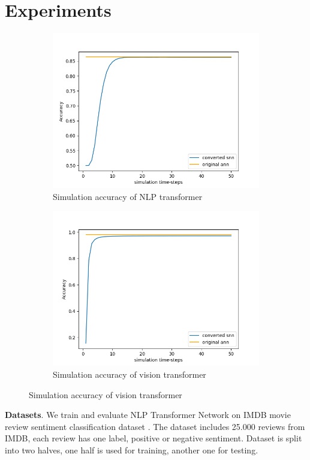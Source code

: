\documentclass{article}
\begin{document}
\section{Experiments}

\begin{figure}
\centering
    \begin{subfigure}
      \centering
      \includegraphics[width=0.7\linewidth]{assets_simulated_accuracy_nlp_v2.png}
      \caption[width=.4\linewidth]{Simulation accuracy of NLP transformer}
      \label{fig:sub1}
    \end{subfigure}
    \begin{subfigure}
      \centering
      \includegraphics[width=0.7\linewidth]{assets_simulated_accuracy_vit_v2.png}
      \caption{Simulation accuracy of vision transformer}
      \label{fig:sub2}
    \end{subfigure}
\label{fig:test}
\end{figure}

\textbf{Datasets}. We train and evaluate NLP Transformer Network on IMDB movie review sentiment classification dataset \cite{imdb_dataset}. The dataset includes 25.000 reviews from IMDB, each review has one label, positive or negative sentiment. Dataset is split into two halves, one half is used for training, another one for testing.
\end{document}

